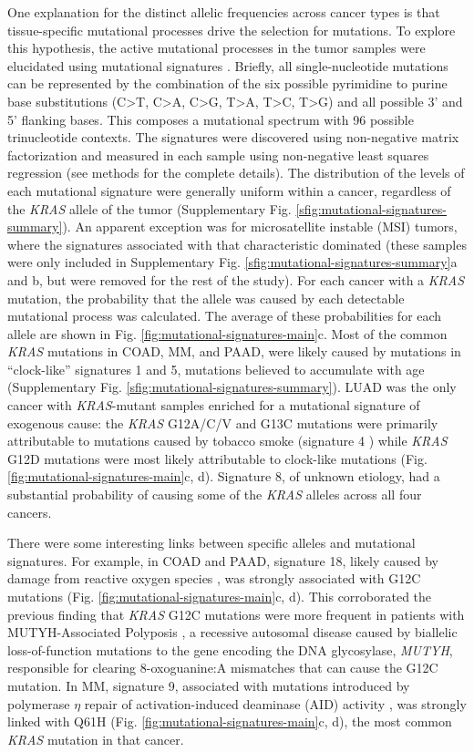 \documentclass[english, 10pt, letterpaper]{article}
\newcommand{\KRAS}{\emph{KRAS}}
\begin{document}
One explanation for the distinct allelic frequencies across cancer types is that tissue-specific mutational processes drive the selection for mutations.
To explore this hypothesis, the active mutational processes in the tumor samples were elucidated using mutational signatures \cite{Alexandrov2013}. 
Briefly, all single-nucleotide mutations can be represented by the combination of the six possible pyrimidine to purine base substitutions (C>T, C>A, C>G, T>A, T>C, T>G) and all possible 3’ and 5’ flanking bases. 
This composes a mutational spectrum with 96 possible trinucleotide contexts. 
The signatures were discovered using non-negative matrix factorization and measured in each sample using non-negative least squares regression (see methods for the complete details). 
The distribution of the levels of each mutational signature were generally uniform within a cancer, regardless of the \KRAS{} allele of the tumor (Supplementary Fig. \ref{sfig:mutational-signatures-summary}). 
An apparent exception was for microsatellite instable (MSI) tumors, where the signatures associated with that characteristic dominated (these samples were only included in Supplementary Fig. \ref{sfig:mutational-signatures-summary}a and b, but were removed for the rest of the study). 
For each cancer with a \KRAS{} mutation, the probability that the allele was caused by each detectable mutational process was calculated. 
The average of these probabilities for each allele are shown in Fig. \ref{fig:mutational-signatures-main}c. 
Most of the common \KRAS{} mutations in COAD, MM, and PAAD, were likely caused by mutations in “clock-like” signatures 1 and 5, mutations believed to accumulate with age \cite{Alexandrov2015} (Supplementary Fig. \ref{sfig:mutational-signatures-summary}). 
LUAD was the only cancer with \KRAS{}-mutant samples enriched for a mutational signature of exogenous cause: the \KRAS{} G12A/C/V and G13C mutations were primarily attributable to mutations caused by tobacco smoke (signature 4 \cite{Alexandrov2016}) while \KRAS{} G12D mutations were most likely attributable to clock-like mutations (Fig. \ref{fig:mutational-signatures-main}c, d).
Signature 8, of unknown etiology, had a substantial probability of causing some of the \KRAS{} alleles across all four cancers.

There were some interesting links between specific alleles and mutational signatures.
For example, in COAD and PAAD, signature 18, likely caused by damage from reactive oxygen species \cite{Viel2017, Pilati2017}, was strongly associated with G12C mutations (Fig. \ref{fig:mutational-signatures-main}c, d).
This corroborated the previous finding that \KRAS{} G12C mutations were more frequent in patients with MUTYH-Associated Polyposis \cite{Viel2017}, a recessive autosomal disease caused by biallelic loss-of-function mutations to the gene encoding the DNA glycosylase, \emph{MUTYH}, responsible for clearing 8-oxoguanine:A mismatches that can cause the G12C mutation.
In MM, signature 9, associated with mutations introduced by polymerase $\eta$ repair of activation-induced deaminase (AID) activity \cite{Alexandrov2013, Rogozin2018DNACancer., Petljak2016UnderstandingCancer.}, was strongly linked with Q61H (Fig. \ref{fig:mutational-signatures-main}c, d), the most common \KRAS{} mutation in that cancer.
\end{document}

